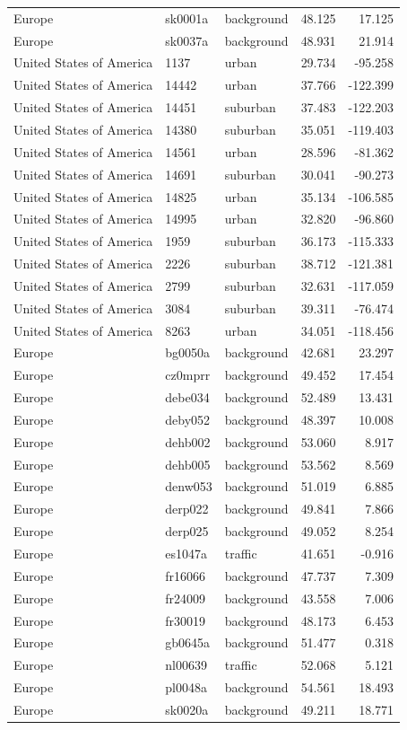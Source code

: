 \documentclass{article}
\begin{document}
\begin{longtable}{lllrr}
Europe & sk0001a & background & 48.125 & 17.125 \\ 
Europe & sk0037a & background & 48.931 & 21.914 \\ 
United States of America & 1137 & urban & 29.734 & -95.258 \\ 
United States of America & 14442 & urban & 37.766 & -122.399 \\ 
United States of America & 14451 & suburban & 37.483 & -122.203 \\ 
United States of America & 14380 & suburban & 35.051 & -119.403 \\ 
United States of America & 14561 & urban & 28.596 & -81.362 \\ 
United States of America & 14691 & suburban & 30.041 & -90.273 \\ 
United States of America & 14825 & urban & 35.134 & -106.585 \\ 
United States of America & 14995 & urban & 32.820 & -96.860 \\ 
United States of America & 1959 & suburban & 36.173 & -115.333 \\ 
United States of America & 2226 & suburban & 38.712 & -121.381 \\ 
United States of America & 2799 & suburban & 32.631 & -117.059 \\ 
United States of America & 3084 & suburban & 39.311 & -76.474 \\ 
United States of America & 8263 & urban & 34.051 & -118.456 \\ 
Europe & bg0050a & background & 42.681 & 23.297 \\ 
Europe & cz0mprr & background & 49.452 & 17.454 \\ 
Europe & debe034 & background & 52.489 & 13.431 \\ 
Europe & deby052 & background & 48.397 & 10.008 \\ 
Europe & dehb002 & background & 53.060 & 8.917 \\ 
Europe & dehb005 & background & 53.562 & 8.569 \\ 
Europe & denw053 & background & 51.019 & 6.885 \\ 
Europe & derp022 & background & 49.841 & 7.866 \\ 
Europe & derp025 & background & 49.052 & 8.254 \\ 
Europe & es1047a & traffic & 41.651 & -0.916 \\ 
Europe & fr16066 & background & 47.737 & 7.309 \\ 
Europe & fr24009 & background & 43.558 & 7.006 \\ 
Europe & fr30019 & background & 48.173 & 6.453 \\ 
Europe & gb0645a & background & 51.477 & 0.318 \\ 
Europe & nl00639 & traffic & 52.068 & 5.121 \\ 
Europe & pl0048a & background & 54.561 & 18.493 \\ 
Europe & sk0020a & background & 49.211 & 18.771 \\ 
\bottomrule
\end{longtable}
\endgroup
\end{document}
